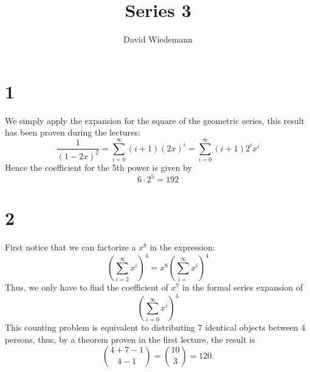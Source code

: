 \documentclass[11pt, a4paper, twoside]{article}
\begin{document}
\title{Series 3}
\author{David Wiedemann}
\maketitle
\section*{1}
We simply apply the expansion for the square of the geometric series, this result has been proven during the lectures:
\[ 
	\frac{1}{( 1-2x)^{2} } = \sum_{i=0}^{ \infty  } ( i+1) ( 2x) ^{i} =\sum_{i=0}^{ \infty  } ( i+1) 2^{i} x ^{i} 
\]
Hence the coefficient for the 5th power is given by
\[ 
6 \cdot 2^5 = 192
\]
\section*{2}
First notice that we can factorize a $x^8$ in the expression:
\[ 
	\left( \sum_{i=2}^{ \infty } x^{i} \right)^{4} = x^8 \left( \sum_{i=}^{ \infty } x^{i}\right)^{4}
\]
Thus, we only have to find the coefficient of $x^7$ in the formal series expansion of
\[ 
 \left( \sum_{i=0}^{ \infty } x^{i} \right)^{4}	
\]
This counting problem is equivalent to distributing 7 identical objects between 4 persons, thus, by a theorem proven in the first lecture, the result is
\[ 
\binom { 4+7-1} { 4-1} = \binom { 10 } 3 = 120.
\]










\end{document}
